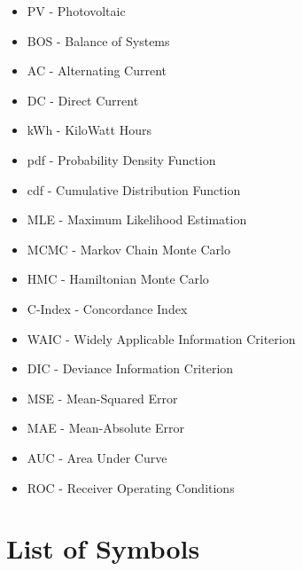 \begin{itemize}

\item[] PV -  Photovoltaic
\item[] BOS - Balance of Systems
\item[] AC - Alternating Current
\item[] DC - Direct Current
\item[] kWh - KiloWatt Hours

\item[] pdf - Probability Density Function
\item[] cdf - Cumulative Distribution Function
\item[] MLE - Maximum Likelihood Estimation
\item[] MCMC - Markov Chain Monte Carlo
\item[] HMC - Hamiltonian Monte Carlo

\item[] C-Index - Concordance Index
\item[] WAIC - Widely Applicable Information Criterion
\item[] DIC - Deviance Information Criterion

\item[] MSE - Mean-Squared Error
\item[] MAE - Mean-Absolute Error

\item[] AUC - Area Under Curve
\item[] ROC - Receiver Operating Conditions


\end{itemize}

\section*{List of Symbols}

